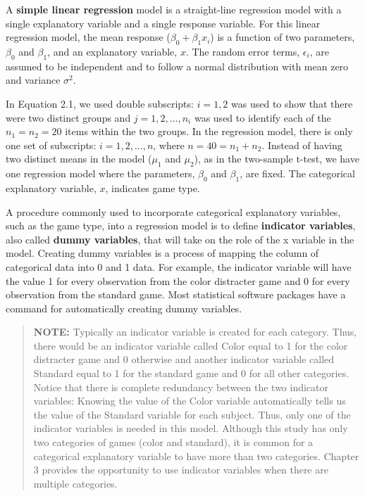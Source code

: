 \documentclass[
]{report}
\begin{document}
A \textbf{simple linear regression} model is a straight-line regression model with a single explanatory variable and a single response variable. For this linear regression model, the mean response (\(\scriptstyle \beta_0 + \beta_1x_i\)) is a function of two parameters, \(\scriptstyle \beta_0\) and \(\scriptstyle \beta_1\), and an explanatory variable, \(\scriptstyle x\). The random error terms, \(\scriptstyle \epsilon_i\), are assumed to be independent and to follow a normal distribution with mean zero and variance \(\scriptstyle \sigma^2\).

In Equation 2.1, we used double subscripts: \(\scriptstyle i = 1, 2\) was used to show that there were two distinct groups and \(\scriptstyle j = 1, 2, ... , n_i\) was used to identify each of the \(\scriptstyle n_1 = n_2 = 20\) items within the two groups. In the regression model, there is only one set of subscripts: \(\scriptstyle i = 1, 2, ..., n\), where \(\scriptstyle n = 40 = n_1 + n_2\). Instead of having two distinct means in the model (\(\scriptstyle \mu_1\) and \(\scriptstyle \mu_2\)), as in the two-sample t-test, we have one regression model where the parameters, \(\scriptstyle \beta_0\) and \(\scriptstyle \beta_1\), are fixed. The categorical explanatory variable, \(\scriptstyle x\), indicates game type.

A procedure commonly used to incorporate categorical explanatory variables, such as the game type, into a regression model is to define \textbf{indicator variables}, also called \textbf{dummy variables}, that will take on the role of the x variable in the model. Creating dummy variables is a process of mapping the column of categorical data into 0 and 1 data. For example, the indicator variable will have the value 1 for every observation from the color distracter game and 0 for every observation from the standard game. Most statistical software packages have a command for automatically creating dummy variables.

\begin{quote}
\textbf{NOTE:}
Typically an indicator variable is created for each category. Thus, there would be an indicator variable called Color equal to 1 for the color distracter game and 0 otherwise and another indicator variable called Standard equal to 1 for the standard game and 0 for all other categories. Notice that there is complete redundancy between the two indicator variables: Knowing the value of the Color variable automatically tells us the value of the Standard variable for each subject. Thus, only one of the indicator variables is needed in this model. Although this study has only two categories of games (color and standard), it is common for a categorical explanatory variable to have more than two categories. Chapter 3 provides the opportunity to use indicator variables when there are multiple categories.
\end{quote}
\end{document}
